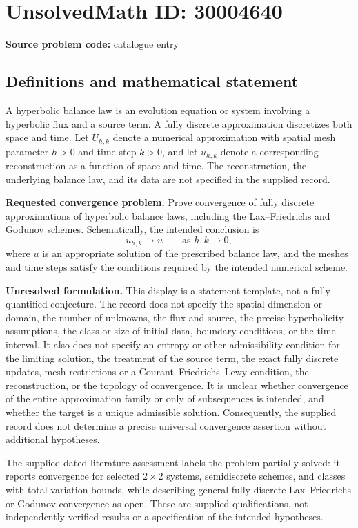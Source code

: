 \documentclass[11pt]{article}
\begin{document}
\section*{UnsolvedMath ID: 30004640}
\textbf{Source problem code:} catalogue entry
\subsection{Definitions and mathematical statement}
A hyperbolic balance law is an evolution equation or system involving a hyperbolic flux and a source term. A fully discrete approximation discretizes both space and time. Let \(U_{h,k}\) denote a numerical approximation with spatial mesh parameter \(h>0\) and time step \(k>0\), and let \(u_{h,k}\) denote a corresponding reconstruction as a function of space and time. The reconstruction, the underlying balance law, and its data are not specified in the supplied record.

\textbf{Requested convergence problem.} Prove convergence of fully discrete approximations of hyperbolic balance laws, including the Lax--Friedrichs and Godunov schemes. Schematically, the intended conclusion is
\[
 u_{h,k}\longrightarrow u\qquad\text{as }h,k\to0,
\]
where \(u\) is an appropriate solution of the prescribed balance law, and the meshes and time steps satisfy the conditions required by the intended numerical scheme.

\textbf{Unresolved formulation.} This display is a statement template, not a fully quantified conjecture. The record does not specify the spatial dimension or domain, the number of unknowns, the flux and source, the precise hyperbolicity assumptions, the class or size of initial data, boundary conditions, or the time interval. It also does not specify an entropy or other admissibility condition for the limiting solution, the treatment of the source term, the exact fully discrete updates, mesh restrictions or a Courant--Friedrichs--Lewy condition, the reconstruction, or the topology of convergence. It is unclear whether convergence of the entire approximation family or only of subsequences is intended, and whether the target is a unique admissible solution. Consequently, the supplied record does not determine a precise universal convergence assertion without additional hypotheses.

The supplied dated literature assessment labels the problem partially solved: it reports convergence for selected \(2\times2\) systems, semidiscrete schemes, and classes with total-variation bounds, while describing general fully discrete Lax--Friedrichs or Godunov convergence as open. These are supplied qualifications, not independently verified results or a specification of the intended hypotheses.
\end{document}
